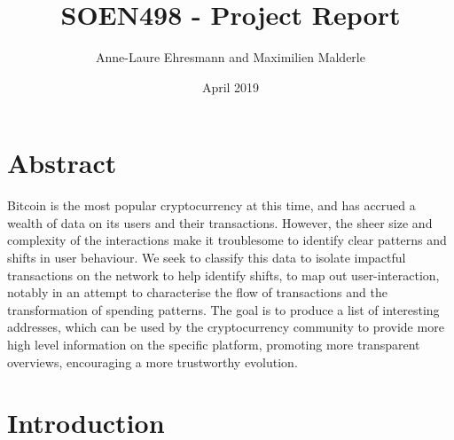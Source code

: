 \documentclass{article}
\title{SOEN498 - Project Report}
\author{Anne-Laure Ehresmann and Maximilien Malderle}
\date{April 2019}
\begin{document}
\maketitle

\section{Abstract}

Bitcoin is the most popular cryptocurrency at this time, and has accrued 
a wealth of data on its users and their transactions. However, the sheer 
size and complexity of the interactions make it troublesome to identify clear 
patterns and shifts in user behaviour. We seek to classify this data to isolate impactful transactions
on the network to help identify shifts, to map out user-interaction, notably in an attempt to 
characterise the flow of transactions and the transformation of spending patterns. 
The goal is to produce a list of interesting addresses, which can be used by the 
cryptocurrency community to provide more high level information on the specific platform,
promoting more transparent overviews, encouraging a more trustworthy evolution.

\section{Introduction}
\end{document}
